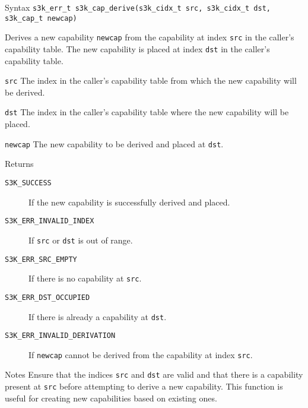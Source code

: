 \documentclass[a4paper,11pt]{article}
\newenvironment{syscalldoc}[1]{
  \begin{tcolorbox}[breakable,title=\subsection{\texttt{#1()}}]
  \begin{description}[leftmargin=!,style=nextline,noitemsep]
}{
  \end{description}
  \end{tcolorbox}
}
\begin{document}
\begin{syscalldoc}{s3k\_cap\_derive}
  \item[Syntax] \lstinline{s3k_err_t s3k_cap_derive(s3k_cidx_t src, s3k_cidx_t dst, s3k_cap_t newcap)}
  \item[Description]
	  Derives a new capability \verb|newcap| from the capability at index \verb|src| in the caller's capability table. The new capability is placed at index \verb|dst| in the caller's capability table.

  \item[Parameters]
    \begin{description}
      \item[]
      \item[\texttt{src}] The index in the caller's capability table from which the new capability will be derived.
      \item[\texttt{dst}] The index in the caller's capability table where the new capability will be placed.
      \item[\texttt{newcap}] The new capability to be derived and placed at \verb|dst|.
    \end{description}

  \item[Returns]
    \begin{description}
      \item[]
      \item[\texttt{S3K\_SUCCESS}] If the new capability is successfully derived and placed.
      \item[\texttt{S3K\_ERR\_INVALID\_INDEX}] If \verb|src| or \verb|dst| is out of range.
      \item[\texttt{S3K\_ERR\_SRC\_EMPTY}] If there is no capability at \verb|src|.
      \item[\texttt{S3K\_ERR\_DST\_OCCUPIED}] If there is already a capability at \verb|dst|.
      \item[\texttt{S3K\_ERR\_INVALID\_DERIVATION}] If \verb|newcap| cannot be derived from the capability at index \verb|src|.
    \end{description}

  \item[Notes]
	  Ensure that the indices \verb|src| and \verb|dst| are valid and that there is a capability present at \verb|src| before attempting to derive a new capability. This function is useful for creating new capabilities based on existing ones.
\end{syscalldoc}
\end{document}
